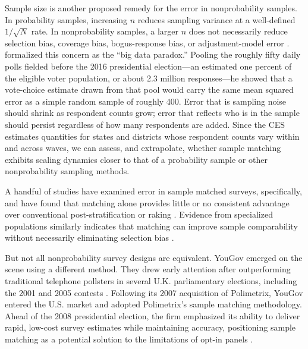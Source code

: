 \documentclass[12pt]{article}
\begin{document}
Sample size is another proposed remedy for the error in nonprobability samples. In probability samples, increasing $n$ reduces sampling variance at a well-defined $1/\sqrt{N}$ rate. In nonprobability samples, a larger $n$ does not necessarily reduce selection bias, coverage bias, bogus-response bias, or adjustment-model error \parencite{elliott_inference_2017, mercer_theory_2017}. \textcite{meng_statistical_2018} formalized this concern as the ``big data paradox.'' Pooling the roughly fifty daily polls fielded before the 2016 presidential election---an estimated one percent of the eligible voter population, or about 2.3 million responses---he showed that a vote-choice estimate drawn from that pool would carry the same mean squared error as a simple random sample of roughly 400. Error that is sampling noise should shrink as respondent counts grow; error that reflects who is in the sample should persist regardless of how many respondents are added. Since the CES estimates quantities for states and districts whose respondent counts vary within and across waves, we can assess, and extrapolate, whether sample matching exhibits scaling dynamics closer to that of a probability sample or other nonprobability sampling methods. 

A handful of studies have examined error in sample matched surveys, specifically, and have found that matching alone provides little or no consistent advantage over conventional post-stratification or raking \parencite{brick_weighting_2015, buskirk_probability_2015, mercer_for_2018}. Evidence from specialized populations similarly indicates that matching can improve sample comparability without necessarily eliminating selection bias \parencite{disogra_matching_2015}.

But not all nonprobability survey designs are equivalent. YouGov emerged on the scene using a different method. They drew early attention after outperforming traditional telephone pollsters in several U.K. parliamentary elections, including the 2001 and 2005 contests \parencite{coleman_online_2001, electoralcalculus_2005}. Following its 2007 acquisition of Polimetrix, YouGov entered the U.S. market and adopted Polimetrix’s sample matching methodology. Ahead of the 2008 presidential election, the firm emphasized its ability to deliver rapid, low-cost survey estimates while maintaining accuracy, positioning sample matching as a potential solution to the limitations of opt-in panels \parencite{crampton_about_2007, bradshaw_yougov_2008}. 
\end{document}
